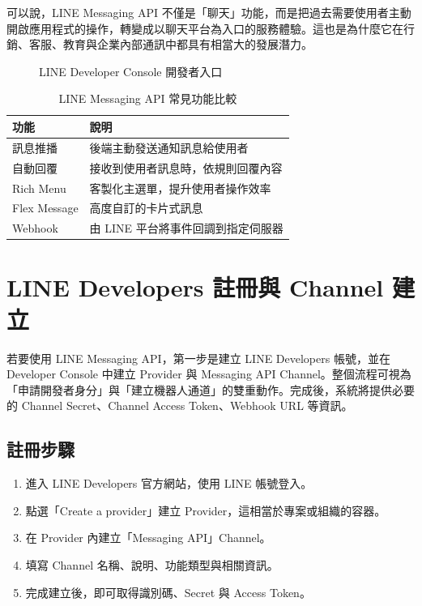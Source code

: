 可以說，LINE Messaging API 不僅是「聊天」功能，而是把過去需要使用者主動開啟應用程式的操作，轉變成以聊天平台為入口的服務體驗。這也是為什麼它在行銷、客服、教育與企業內部通訊中都具有相當大的發展潛力。

\begin{figure}[H]
\centering
{}
\caption{LINE Developer Console 開發者入口}
\end{figure}

\begin{table}[H]
\centering
\caption{LINE Messaging API 常見功能比較}
\begin{tabular}{p{4.5cm}p{7.5cm}}
\toprule
功能 & 說明 \\
\midrule
訊息推播 & 後端主動發送通知訊息給使用者 \\
自動回覆 & 接收到使用者訊息時，依規則回覆內容 \\
Rich Menu & 客製化主選單，提升使用者操作效率 \\
Flex Message & 高度自訂的卡片式訊息 \\
Webhook & 由 LINE 平台將事件回調到指定伺服器 \\
\bottomrule
\end{tabular}
\end{table}

\chapter{LINE Developers 註冊與 Channel 建立}

若要使用 LINE Messaging API，第一步是建立 LINE Developers 帳號，並在 Developer Console 中建立 Provider 與 Messaging API Channel。整個流程可視為「申請開發者身分」與「建立機器人通道」的雙重動作。完成後，系統將提供必要的 Channel Secret、Channel Access Token、Webhook URL 等資訊。

\section{註冊步驟}

\begin{enumerate}[leftmargin=2em]
    \item 進入 LINE Developers 官方網站，使用 LINE 帳號登入。
    \item 點選「Create a provider」建立 Provider，這相當於專案或組織的容器。
    \item 在 Provider 內建立「Messaging API」Channel。
    \item 填寫 Channel 名稱、說明、功能類型與相關資訊。
    \item 完成建立後，即可取得識別碼、Secret 與 Access Token。
\end{enumerate}

